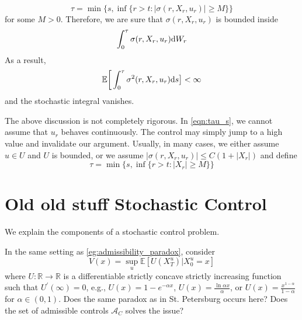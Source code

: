 \documentclass[11pt]{book}
\newcommand{\ds}{\text{\normalfont d}s}
\newcommand{\dW}{\text{\normalfont d}W}
\begin{document}
\begin{equation}\label{eqn:tau_s}
    \tau=\min\Big\{s,\inf\{r>t: |\sigma(r,X_r,u_r)|\ge M \}\Big\}
\end{equation}
for some $M>0$. Therefore, we are sure that  $\sigma(r,X_r,u_r)$ is bounded inside
\[
\int_0^\tau \sigma(r,X_r,u_r)\dW_r
\]
As a result, 
\[
\mathbb{E}\bigg[\int_0^\tau \sigma^2(r,X_r,u_r)\ds\big]<\infty
\]
and the stochastic integral vanishes. 
\begin{rem}
    The above discussion is not completely rigorous. In \eqref{eqn:tau_s}, we cannot assume that $u_r$ behaves continuously. The control may simply jump to a high value and invalidate our argument. Usually, in many cases, we either assume $u\in U$ and $U$ is bounded, or we assume $|\sigma(r,X_r,u_r)|\le C(1+|X_r|)$ and define 
    \[
    \tau=\min\Big\{s,\inf\{r>t: |X_r|\ge M \}\Big\}
    \]
\end{rem}
\chapter{Old old stuff Stochastic Control}
We explain the components of a stochastic control problem.

\begin{ex}
    In the same setting as \ref{eg:admissibility_paradox}, consider
    \begin{equation}\label{prob:merton}
        V(x) = \sup_{u}\mathbb{E}[U(X_T^u)|X^u_0=x]
    \end{equation}
    where $U:\mathbb{R}\to\mathbb{R}$ is a differentiable strictly concave strictly increasing function such that $U^\prime(\infty)=0$, e.g., $U(x)=1-e^{-\alpha x}$, $U(x) = \frac{\ln \alpha x}{\alpha}$, or $U(x) = \frac{x^{1-\alpha}}{1-\alpha}$ for $\alpha\in(0,1)$.
    Does the same paradox as in St. Petersburg occurs here?
    Does the set of admissible controls $\mathcal{A}_C$ solves the issue?
\end{ex}






\end{document}
